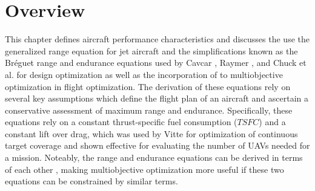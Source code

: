 \section{Overview}
\hspace{0.5cm} This chapter defines aircraft performance characteristics and discusses the use the generalized range equation for jet aircraft and the simplifications known as the Br\'eguet range and endurance equations used by  Cavcar \cite{breguetRangeEqn}, Raymer \cite{LoiterTimeFromRange}, and Chuck et al. \cite{fuelsLOGRange} for design optimization as well as the incorporation of to multiobjective optimization in flight optimization. The derivation of these equations rely on several key assumptions which define the flight plan of an aircraft and ascertain a conservative assessment of maximum range and endurance. Specifically, these equations rely on a constant thrust-specific fuel consumption ($TSFC$) and a constant lift over drag, which was used by Vitte \cite{OptimizeBreguet} for optimization of continuous target coverage and shown effective for evaluating the number of UAVs needed for a mission. Noteably, the range and endurance equations can be derived in terms of each other \cite{LoiterTimeFromRange}, making multiobjective optimization more useful if these two equations can be constrained by similar terms. 
